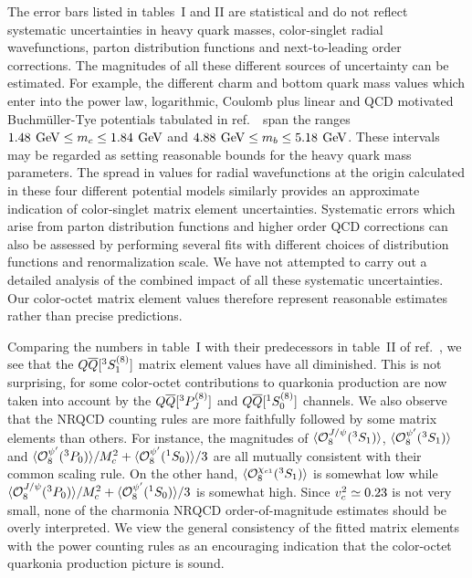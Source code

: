 {	The error bars listed in tables~I and II are statistical and do 
not reflect systematic uncertainties in heavy quark masses, color-singlet 
radial wavefunctions, parton distribution functions and next-to-leading order 
corrections.  The magnitudes of all these different sources of uncertainty can 
be estimated.  For example, the different charm and bottom quark mass values 
which enter into the power law, logarithmic, Coulomb plus linear and QCD 
motivated Buchm\"uller-Tye potentials tabulated in ref.~\Quigg\ span 
the ranges $1.48 {\>\, \rm GeV} \le m_c \le 1.84 {\>\, \rm GeV}$ and $4.88 {\>\, \rm GeV} \le m_b \le 5.18 
{\>\, \rm GeV}$.  These intervals may be regarded as setting reasonable bounds for 
the heavy quark mass parameters.  The spread in values for radial 
wavefunctions at the origin calculated in these four different potential models 
similarly provides an approximate indication of color-singlet matrix element 
uncertainties.  Systematic errors which arise from parton distribution 
functions and higher order QCD corrections can also be assessed by performing 
several fits with different choices of distribution functions and 
renormalization scale.  We have not attempted to carry out a detailed 
analysis of the combined impact of all these systematic uncertainties.  Our 
color-octet matrix element values therefore represent reasonable estimates 
rather than precise predictions. 

	Comparing the numbers in table~I with their predecessors in table~II 
of ref.~\ChoLeibov, we see that the $Q{\overline Q}[ ^3S_1^{(8)}]$ matrix element values 
have all diminished.  This is not surprising, for some color-octet 
contributions to quarkonia production are now taken into account by the 
$Q{\overline Q}[ ^3P_J^{(8)}]$ and $Q{\overline Q}[ ^1S_0^{(8)}]$ channels.  We also observe that the 
NRQCD counting rules are more faithfully followed by some matrix elements than 
others.  For instance, the magnitudes of $\langle{\cal O}_8^{J/\psi}(^3S_1)\rangle$, 
$\langle{\cal O}_8^{\psi'}(^3S_1)\rangle$ and 
$\langle{\cal O}_8^{\psi'}(^3P_0)\rangle/M_c^2 
+\langle{\cal O}_8^{\psi'}(^1S_0)\rangle/3$ are all mutually consistent with their 
common scaling rule.  On the other hand, 
$\langle{\cal O}_8^{\chi_{c1}}(^3S_1)\rangle$ is somewhat low while
$\langle{\cal O}_8^{J/\psi}(^3P_0)\rangle/M_c^2+\langle{\cal O}_8^{\psi'}(^1S_0)\rangle/3$ 
is somewhat high.  Since $v_c^2 \simeq 0.23$ is not very small, none of the 
charmonia NRQCD order-of-magnitude estimates should be overly interpreted.  
We view the general consistency of the fitted matrix elements
with the power counting rules as an encouraging indication that the 
color-octet quarkonia production picture is sound.  

}
